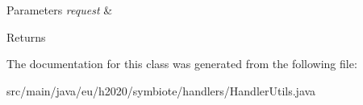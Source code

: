 \begin{DoxyParams}{Parameters}
{\em request} & \\
\hline
\end{DoxyParams}
\begin{DoxyReturn}{Returns}

\end{DoxyReturn}


The documentation for this class was generated from the following file\+:\begin{DoxyCompactItemize}
\item 
src/main/java/eu/h2020/symbiote/handlers/Handler\+Utils.\+java\end{DoxyCompactItemize}

